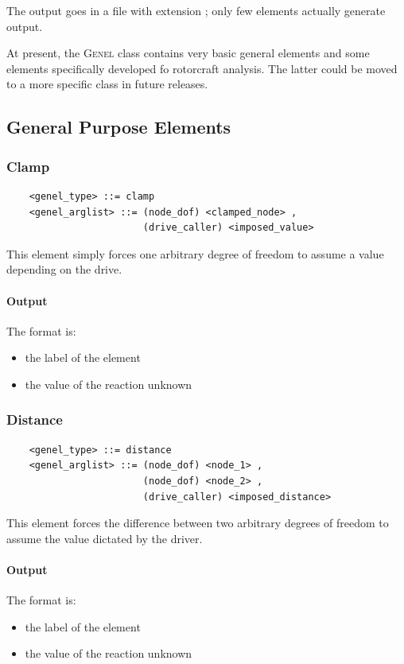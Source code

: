 \noindent
The output goes in a file with extension ; only few elements
actually generate output.

\noindent
At present, the \textsc{Genel} class contains very basic general elements
and some elements specifically developed fo rotorcraft analysis.
The latter could be moved to a more specific class in future releases.

\subsection{General Purpose Elements}
   
\subsubsection{Clamp}
\begin{verbatim}
    <genel_type> ::= clamp
    <genel_arglist> ::= (node_dof) <clamped_node> ,
                        (drive_caller) <imposed_value>
\end{verbatim}
This element simply forces one arbitrary degree of freedom to assume a value
depending on the drive.

\paragraph{Output}
The format is:
\begin{itemize}
    \item the label of the element
    \item the value of the reaction unknown
\end{itemize}
  
\subsubsection{Distance}
\begin{verbatim}
    <genel_type> ::= distance
    <genel_arglist> ::= (node_dof) <node_1> ,
                        (node_dof) <node_2> ,
                        (drive_caller) <imposed_distance>
\end{verbatim}
This element forces the difference between two arbitrary degrees of freedom
to assume the value dictated by the driver.

\paragraph{Output}
The format is:
\begin{itemize}
    \item the label of the element
    \item the value of the reaction unknown
\end{itemize}
  
